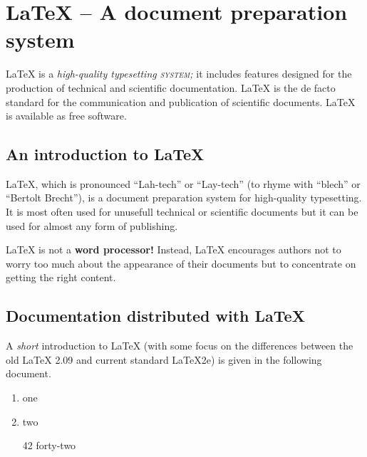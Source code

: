 \documentclass[12pt]{article}
\begin{document}
\section*{LaTeX – A document preparation system}

LaTeX is a \textit{high-quality typesetting \textsc{system;}} it includes features designed for the production of technical and scientific documentation. 
LaTeX is the de facto standard for the communication and publication of scientific documents. LaTeX is available as free software.

\subsection*{An introduction to LaTeX}

LaTeX, which is pronounced ``Lah-tech'' or ``Lay-tech'' (to rhyme with ``blech'' or ``Bertolt Brecht''), is a document preparation system for high-quality typesetting. It is most often used for unusefull technical or scientific documents but it can be used for almost any form of publishing.

\hrulefill

LaTeX is not a \textbf{word processor!} Instead, LaTeX encourages authors not to worry too much about the appearance of their documents but to concentrate on getting the right content.


\subsection*{Documentation distributed with LaTeX}
A \emph{short} introduction to LaTeX (with some focus on the differences between the old LaTeX 2.09 and current standard LaTeX2e) is given in the following document.

\begin{enumerate}
\item one
\item two
\item [42] forty-two
\end{enumerate}
\end{document}
